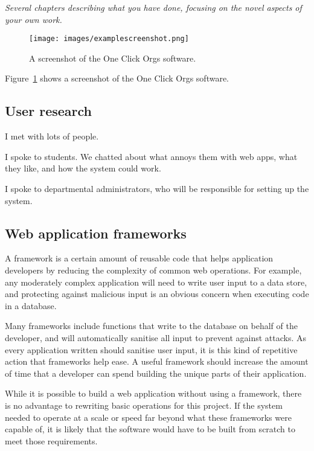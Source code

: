 \documentclass[]{article}
\begin{document}
\textit{Several chapters describing what you have done, focusing on the novel aspects of your own work.}

\begin{figure}
  \begin{center}
    \texttt{[image: images/examplescreenshot.png]}
  \end{center}
  \caption{A screenshot of the One Click Orgs software.}
  \label{ocoscreenshot}
\end{figure}

Figure~\ref{ocoscreenshot} shows a screenshot of the One Click Orgs software.

\subsection{User research}

I met with lots of people.

I spoke to students. We chatted about what annoys them with web apps, what they like, and how the system could work.

I spoke to departmental administrators, who will be responsible for setting up the system.

\subsection{Web application frameworks}

A framework is a certain amount of reusable code that helps application developers by reducing the complexity of common web operations. For example, any moderately complex application will need to write user input to a data store, and protecting against malicious input is an obvious concern when executing code in a database.

Many frameworks include functions that write to the database on behalf of the developer, and will automatically sanitise all input to prevent against attacks. As every application written should sanitise user input, it is this kind of repetitive action that frameworks help ease. A useful framework should increase the amount of time that a developer can spend building the unique parts of their application.

While it is possible to build a web application without using a framework, there is no advantage to rewriting basic operations for this project. If the system needed to operate at a scale or speed far beyond what these frameworks were capable of, it is likely that the software would have to be built from scratch to meet those requirements.
\end{document}
